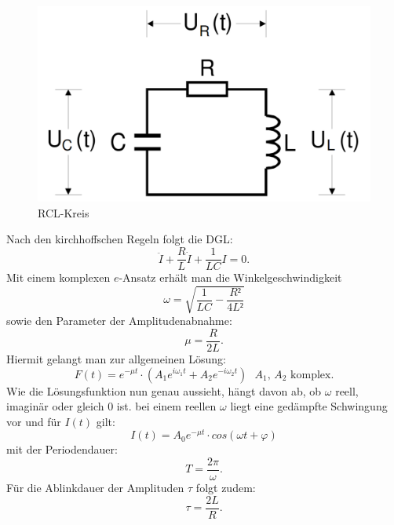  \begin{figure}[H]
   \centering
   \includegraphics[width=\linewidth-200pt,height=\textheight-200pt,keepaspectratio]{content/RCL.png}
   \caption{RCL-Kreis}
   \label{fig:RCL_Kreis}
 \end{figure}

Nach den kirchhoffschen Regeln folgt die DGL:
 \begin{equation}
   \ddot{I} + \frac{R}{L} \dot{I} + \frac{1}{LC}I = 0\text{.}
 \end{equation}
 Mit einem komplexen $e$-Ansatz erhält man die Winkelgeschwindigkeit
 \begin{equation}
   \omega = \sqrt{\frac{1}{LC}-\frac{R²}{4L²}}
 \end{equation}
 sowie den Parameter der Amplitudenabnahme:
 \begin{equation}
 \mu = \frac{R}{2L}\text{.}
 \end{equation}
 Hiermit gelangt man zur allgemeinen Lösung:
 \begin{equation}
   F(t) = e^{-\mu t} \cdot  \left( A_1e^{i\omega_1t} + A_2e^{-i\omega_2t} \right) \text{ } A_1\text{, } A_2 \text{ komplex.}
 \end{equation}
 Wie die Lösungsfunktion nun genau aussieht, hängt davon ab, ob $\omega$ reell, imaginär
  oder gleich 0 ist.
  bei einem reellen $\omega$ liegt eine gedämpfte Schwingung vor und für $I(t)$ gilt:
  \begin{equation}
    I(t) = A_0 e^{-\mu t} \cdot cos(\omega t + \varphi)
  \end{equation}
 mit der Periodendauer:
  \begin{equation}
    T = \frac{2 \pi}{\omega}\text{.}
  \end{equation}
  Für die Ablinkdauer der Amplituden $\tau$ folgt zudem:
  \begin{equation}
    \tau = \frac{2L}{R}\text{.}
  \end{equation}

